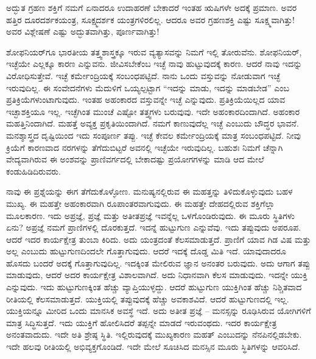 ಅದ್ಭುತ ಗ್ರಹಣ ಶಕ್ತಿಗೆ ನಮಗೆ ಏನಾದರೂ ಉದಾಹರಣೆ ಬೇಕಾದರೆ ಇಂತಹ ಋಷಿಗಳೇ ಅದಕ್ಕೆ ಪ್ರಮಾಣ. ಅವರ ಹತ್ತಿರ ದೂರದರ್ಶಕಯಂತ್ರ, ಸೂಕ್ಷ್ಮದರ್ಶಕ ಯಂತ್ರಗಳಿರಲಿಲ್ಲ. ಆದರೂ ಅವರ ಗ್ರಹಣಶಕ್ತಿ ಎಷ್ಟು ಸೂಕ್ಷ್ಮವಾಗಿತ್ತು! ಅವರ ವಿಶ್ಲೇಷಣೆ ಎಷ್ಟು ಅದ್ಭುತವಾಗಿತ್ತು, ಪೂರ್ಣವಾಗಿತ್ತು!

ಶೋಫನಿಯರ್‌ಗೂ ಭಾರತೀಯ ತತ್ತ್ವಶಾಸ್ತ್ರಕ್ಕೂ ಇರುವ ವ್ಯತ್ಯಾಸವನ್ನು ನಿಮಗೆ ಇಲ್ಲಿ ತೋರುವೆನು. ಶೋಫನಿಯರ್, ಇಚ್ಛೆಯೇ ಎಲ್ಲಕ್ಕೂ ಕಾರಣ ಎನ್ನುವನು. ಜೀವಿಸಬೇಕೆಂಬ ಇಚ್ಛೆ ನಾವು ಹುಟ್ಟುವುದಕ್ಕೆ ಕಾರಣ. ಆದರೆ ನಾವು ಇದನ್ನು ವಿರೋಧಿಸುತ್ತೇವೆ. ಇಚ್ಛೆ ಕರ್ಮೇಂದ್ರಿಯಕ್ಕೆ ಸಂಬಂಧಪಟ್ಟಿದೆ. ನಾನು ಒಂದು ವಸ್ತುವನ್ನು ನೋಡುವಾಗ ಇಚ್ಛೆ ಇರುವುದಿಲ್ಲ. ಈ ಸಂವೇದನೆಗಳು ಮೆದುಳಿಗೆ ಒಯ್ಯಲ್ಪಟ್ಟಾಗ “ಇದನ್ನು ಮಾಡು, ಇದನ್ನು ಮಾಡಬೇಡ” ಎಂಬ ಪ್ರತಿಕ್ರಿಯೆಗಳುಂಟಾಗುವುದು. ಇಂತಹ ಅಹಂಕಾರದ ವಸ್ತುವನ್ನೇ ಇಚ್ಛೆ ಎನ್ನುವುದು. ಪ್ರತಿಕ್ರಿಯೆಯಿಲ್ಲದ ಯಾವ ಇಚ್ಛಾಶಕ್ತಿಯೂ ಇಲ್ಲ. ಇಚ್ಛೆಗಿಂತ ಮುಂಚೆ ಎಷ್ಟೋ ತತ್ತ್ವಗಳು ಬರುವುವು. ಇದೇ ಅಹಂಕಾರದಿಂದಾಗಿದೆ. ಅಹಂಕಾರ ಮಹತ್ತಿನಿಂದಾಗಿದೆ. ಮಹತ್ತೆ ಅವ್ಯಕ್ತ ಪ್ರಕೃತಿಯಿಂದಾಗಿದೆ. ನಮಗೆ ಕಾಣುವುದೆಲ್ಲ ಇಚ್ಛೆ ಎಂಬುದು ಬೌದ್ಧರ ಭಾವನೆ. ಮನಶ್ಶಾಸ್ತ್ರದ ದೃಷ್ಟಿಯಿಂದ ಇದು ಸಂಪೂರ್ಣ ತಪ್ಪು. ಇಚ್ಛೆ ಕೇವಲ ಕರ್ಮೇಂದ್ರಿಯಕ್ಕೆ ಮಾತ್ರ ಸಂಬಂಧಪಟ್ಟಿದೆ. ನೀವು ಕ್ರಿಯೆಗೆ ಕಾರಣವಾದ ನರಗಳನ್ನು ತೆಗೆದುಬಿಟ್ಟರೆ ಅವನಲ್ಲಿ ಇಚ್ಛೆಯೇ ಇರುವುದಿಲ್ಲ. ಬಹುಶಃ ನಿಮಗೆ ಚೆನ್ನಾಗಿ ವೇದ್ಯವಾಗಿರುವ ಈ ಅಂಶವನ್ನು ಪ್ರಾಣಿವರ್ಗದಲ್ಲಿ ಬೇಕಾದಷ್ಟು ಪ್ರಯೋಗಗಳನ್ನು ಮಾಡಿ ಆದ ಮೇಲೆ ಕಂಡುಹಿಡಿದಿರುವರು.

ನಾವು ಈ ಪ್ರಶ್ನೆಯನ್ನು ಈಗ ತೆಗೆದುಕೊಳ್ಳೋಣ. ಮನುಷ್ಯನಲ್ಲಿರುವ ಈ ಮಹತ್ತನ್ನು ತಿಳಿದುಕೊಳ್ಳುವುದು ಬಹಳ ಮುಖ್ಯ. ಈ ಮಹತ್ತೇ ಅಹಂಕಾರವಾಗಿ ರೂಪಾಂತರವಾಗುವುದು. ಈ ಮಹತ್ತೇ ದೇಹದಲ್ಲಿರುವ ಶಕ್ತಿಗೆಲ್ಲಾ ಮೂಲಕಾರಣ. ಇದು ಅಪ್ರಜ್ಞೆ, ಪ್ರಜ್ಞೆ ಮತ್ತು ಅತೀತಪ್ರಜ್ಞೆ ಇವನ್ನೆಲ್ಲ ಒಳಗೊಂಡಿರುವುದು. ಈ ಮೂರು ಸ್ಥಿತಿಗಳು ಏನು? ಅಪ್ರಜ್ಞೆ ನಮಗೆ ಪ್ರಾಣಿಗಳಲ್ಲಿ ದೊರಕುತ್ತದೆ. ಇದನ್ನೆ ಹುಟ್ಟುಗುಣ ಎನ್ನುವೆವು. ಇದು ತಪ್ಪುವುದು ಅಪರೂಪ. ಆದರೆ ಇದರ ಕಾರ್ಯಕ್ಷೇತ್ರ ತುಂಬಾ ಕಿರಿದು. ಅದು ಯಂತ್ರದಂತೆ ಕೆಲಸಮಾಡುತ್ತದೆ. ಪ್ರಾಣಿಗೆ ಯಾವ ಗಿಡ ವಿಷ ಮತ್ತು ಅಲ್ಲ ಎಂಬುದು ಹುಟ್ಟುಗುಣದಿಂದಲೇ ಗೊತ್ತಾಗುವುದು. ಆದರೆ ಇದಕ್ಕೆ ದೊಡ್ಡ ಮಿತಿ ಇದೆ. ಯಾವುದಾದರೂ ಹೊಸದು ಬಂದರೆ ಅದಕ್ಕೆ ಗೊತ್ತಾಗುವುದಿಲ್ಲ. ಇದಕ್ಕಿಂತ ಮೇಲಿರುವ ಜ್ಞಾನ ಅನಂತರ ಬರುವುದು. ಅದು ಆಗಾಗ ತಪ್ಪು ಮಾಡುವುದು, ಆದರೆ ಅದರ ಕಾರ್ಯಕ್ಷೇತ್ರ ವಿಶಾಲವಾಗಿದೆ. ಅದು ನಿಧಾನವಾಗಿ ಕೆಲಸ ಮಾಡುವುದು. ಇದನ್ನೇ ಯುಕ್ತಿ ಎನ್ನುವುದು. ಇದು ಹುಟ್ಟುಗುಣಕ್ಕಿಂತ ಹೆಚ್ಚು ವ್ಯಾಪ್ತಿಯುಳ್ಳದ್ದು. ಆದರೆ ಹುಟ್ಟುಗುಣ ಯುಕ್ತಿಗಿಂತ ಹೆಚ್ಚು ನಿಶ್ಚಿತವಾದ ರೀತಿಯಲ್ಲಿ ಕೆಲಸಮಾಡುತ್ತದೆ. ಯುಕ್ತಿಯಲ್ಲಿ ತಪ್ಪುವುದಕ್ಕೆ ಹೆಚ್ಚು ಅವಕಾಶವಿದೆ. ಆದರೆ ಹುಟ್ಟುಗುಣದಲ್ಲಿ ಇಲ್ಲ. ಯುಕ್ತಿಯನ್ನೂ ಮೀರಿದ ಒಂದು ಮಾನಸಿಕ ಅವಸ್ಥೆ ಇದೆ. ಅದು ಅತೀತ ಪ್ರಜ್ಞೆ – ಮನಸ್ಸನ್ನು ರೂಢಿಸಿರುವ ಯೋಗಿಗಳಿಗೆ ಮಾತ್ರ ಸಿದ್ಧಿಸುತ್ತದೆ. ಇದು ಯುಕ್ತಿಗೆ ಹೋಲಿಸಿದರೆ ತಪ್ಪನ್ನೇ ಮಾಡದೆ ಇರುವಂಥದು. ಇದರ ಕಾರ್ಯಕ್ಷೇತ್ರ ಅನಂತವಾದುದು. ಇದೇ ಅತಿ ಶ್ರೇಷ್ಠ ಸ್ಥಿತಿ. ಇಲ್ಲಿರುವುದಕ್ಕೆ ಮುಖ್ಯಕಾರಣ ಮಹತ್ ಎಂಬುದನ್ನು ನೆನಪಿನಲ್ಲಿಡಬೇಕು. ಇದೇ ಹಲವು ರೀತಿಯಲ್ಲಿ ಅಭಿವ್ಯಕ್ತಗೊಂಡಿದೆ. ಇದೇ ಮೇಲೆ ಸೂಚಿಸಿದ ಮನಸ್ಸಿನ ಮೂರು ಸ್ಥಿತಿಗಳನ್ನು ಆವರಿಸಿದೆ.

